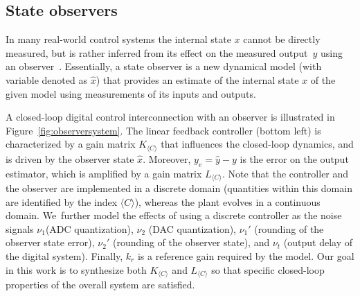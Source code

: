 \documentclass[a4paper,UKenglish]{lipics-v2018}
\newcommand{\mat}[1]{{#1}}
\renewcommand{\vec}[1]{{#1}}
\begin{document}
\subsection{State observers}\label{sec:observer}

In many real-world control systems the internal state $x$ cannot be directly
measured, but is rather inferred from its effect on the measured
output~$\vec{y}$ using an observer~\cite{Astrom08}.  Essentially, a state
observer is a new dynamical model (with variable denoted as $\hat{\vec{x}}$)
that provides an estimate of the internal state $x$ of the given model using
measurements of its inputs and outputs.

A closed-loop digital control interconnection with an observer is
illustrated in Figure~\ref{fig:observersystem}.  The linear feedback
controller (bottom left) is characterized by a gain matrix $\mat{K}_{\langle
C \rangle}$ that influences the closed-loop dynamics, and is driven by the
observer state $\hat{\vec{x}}$.  Moreover, $\vec{y}_e=\hat{\vec{y}} -
\vec{y}$ is the error on the output estimator,
%
%
which is amplified by a gain matrix $\mat{L}_{\langle C \rangle}$.  Note
that the controller and the observer are implemented in a discrete domain
(quantities within this domain are identified by the index $\langle C
\rangle$), whereas the plant evolves in a continuous domain.  We~further
model the effects of using a discrete controller as the noise signals
$\nu_1$(ADC quantization), $\nu_2$ (DAC quantization), $\nu_1'$ (rounding of
the observer state error), $\nu_2'$ (rounding of the observer state), and
$\nu_t$ (output delay of the digital system).  Finally, $k_r$ is a reference
gain required by the model.  Our goal in this work is to synthesize both
$\mat{K}_{\langle C \rangle}$ and $\mat{L}_{\langle C \rangle}$ so that
specific closed-loop properties of the overall system are
satisfied.
 
\end{document}

